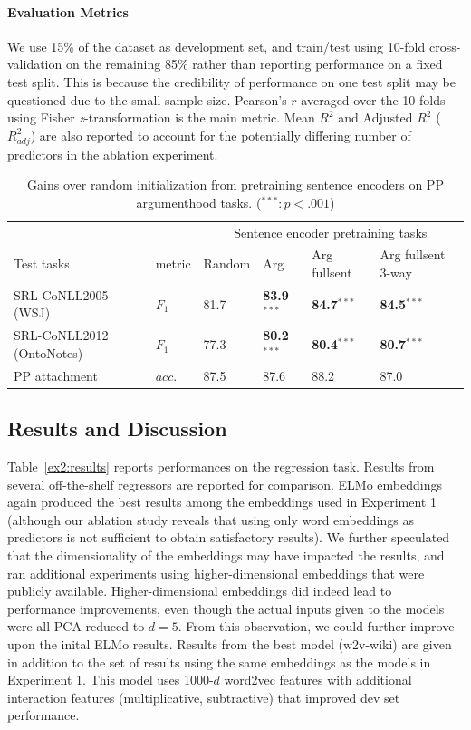 \documentclass[letterpaper]{article} %
\begin{document}
\paragraph{Evaluation Metrics}
We use 15\% of the dataset as development set, and train/test using 10-fold cross-validation on the remaining 85\% rather than reporting performance on a fixed test split. This is because the credibility of performance on one test split may be questioned due to the small sample size. Pearson's $r$ averaged over the 10 folds using Fisher \textit{z}-transformation is the main metric. Mean $R^2$ and Adjusted $R^2$ ($R^2_{adj}$) are also reported to account for the potentially differing number of predictors in the ablation experiment.

\begin{table}[h]
    \centering
	\begin{tabular}{@{}l|l|llll@{}}
		\toprule
		& & \multicolumn{4}{c}{Sentence encoder pretraining tasks} \\
		Test tasks & metric & Random & Arg & Arg fullsent & Arg fullsent 3-way \\ \midrule
		SRL-CoNLL2005 (WSJ)  & $F_1$ &  81.7 & \textbf{83.9$^{***}$} & \textbf{84.7$^{***}$} & \textbf{84.5$^{***}$}  \\
		SRL-CoNLL2012 (OntoNotes) & $F_1$  & 77.3 & \textbf{80.2$^{***}$} & \textbf{80.4$^{***}$} & \textbf{80.7$^{***}$} \\
	    PP attachment \cite{belinkov2014exploring} & $acc.$ & 87.5 & 87.6 & 88.2 & 87.0 \\
		\bottomrule
	\end{tabular}
\caption{\normalsize Gains over random initialization from pretraining sentence encoders on PP argumenthood tasks. ($^{***}: p<.001$)}
\label{exp:pretrain}
\end{table}

\subsection{Results and Discussion}

Table~\ref{ex2:results} reports performances on the regression task. Results from several off-the-shelf regressors are reported for comparison. ELMo embeddings again produced the best results among the embeddings used in Experiment 1 (although our ablation study reveals that using only word embeddings as predictors is not sufficient to obtain satisfactory results). We further speculated that the dimensionality of the embeddings may have impacted the results, and ran additional experiments using higher-dimensional embeddings that were publicly available. Higher-dimensional embeddings did indeed lead to performance improvements, even though the actual inputs given to the models were all PCA-reduced to $d=5$. From this observation, we could further improve upon the inital ELMo results. Results from the best model (w2v-wiki) are given in addition to the set of results using the same embeddings as the models in Experiment 1. This model uses 1000-$d$ word2vec features with additional interaction features (multiplicative, subtractive) that improved dev set performance.
\end{document}
